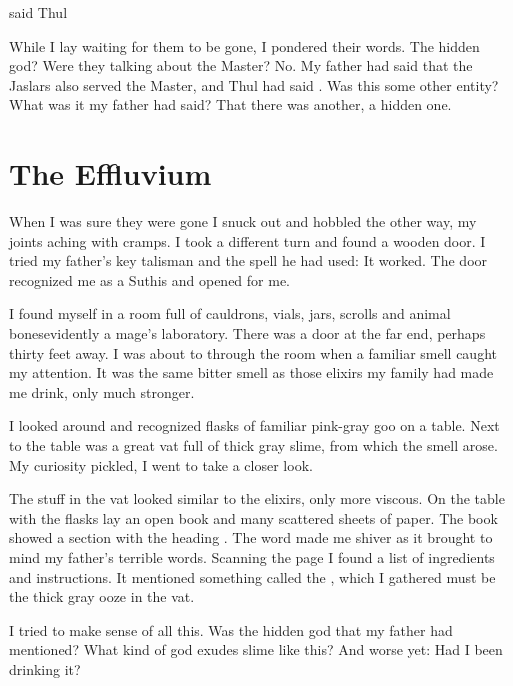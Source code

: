 \documentclass
  [a4paper,
   12pt,
   oneside
  ]%
  {article}
\begin{document}
 said Thul


While I lay waiting for them to be gone, I pondered their words.
The hidden god? 
Were they talking about the Master? 
No. 
My father had said that the Jaslars also served the Master, and Thul had said .
Was this some other entity?
What was it my father had said? 
That there was another, a hidden one.










\section{The Effluvium}
When I was sure they were gone I snuck out and hobbled the other way, my joints aching with cramps. 
I took a different turn and found a wooden door. 
I tried my father's key talisman and the spell he had used: 
It worked. 
The door recognized me as a Suthis and opened for me. 

I found myself in a room full of cauldrons, vials, jars, scrolls and animal bones\dash evidently a mage's laboratory. 
There was a door at the far end, perhaps thirty feet away. 
I was about to through the room when a familiar smell caught my attention. 
It was the same bitter smell as those elixirs my family had made me drink, only much stronger.  

I looked around and recognized flasks of familiar pink-gray goo on a table.
Next to the table was a great vat full of thick gray slime, from which the smell arose. 
My curiosity pickled, I went to take a closer look.

The stuff in the vat looked similar to the elixirs, only more viscous.
On the table with the flasks lay an open book and many scattered sheets of paper. 
The book showed a section with the heading .
The word  made me shiver as it brought to mind my father's terrible words. 
Scanning the page I found a list of ingredients and instructions. 
It mentioned something called the , which I gathered must be the thick gray ooze in the vat. 

I tried to make sense of all this.
Was \Ubloth the hidden god that my father had mentioned? 
What kind of god exudes slime like this? 
And worse yet: 
Had I been drinking it? 
\end{document}

